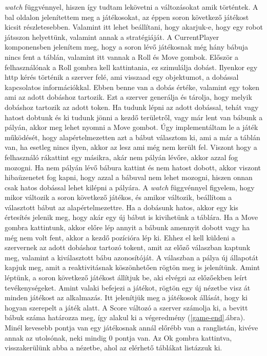 \documentclass[a4paper,twoside]{article}
\begin{document}
\textit{watch} függvénnyel, hiszen így tudtam lekövetni a változásokat amik történtek. A bal oldalon jelenítettem meg a játékosokat, az éppen soron következő játékost kicsit részletesebben. Valamint itt lehet beállítani, hogy akarjuk-e, hogy egy robot játsszon helyettünk, valamint annak a stratégiáját. A CurrentPlayer komponensben jelenítem meg, hogy a soron lévő játékosnak még hány bábuja nincs fent a táblán, valamint itt vannak a Roll és Move gombok. Először a felhasználónak a Roll gombra kell kattintania, ez szimulálja dobást. Ilyenkor egy http kérés történik a szerver felé, ami visszaad egy objektumot, a dobással kapcsolatos információkkal. Ebben benne van a dobás értéke, valamint egy token ami az adott dobáshoz tartozik. Ezt a szerver generálja és tárolja, hogy melyik dobáshoz tartozik az adott token. Ha tudunk lépni az adott dobással, tehát vagy hatost dobtunk és ki tudunk jönni a kezdő területről, vagy már lent van bábunk a pályán, akkor meg lehet nyomni a Move gombot. Úgy implementáltam le a játék működését, hogy alapértelmezetten azt a bábut választom ki, ami a már a táblán van, ha esetleg nincs ilyen, akkor az lesz ami még nem került fel. Viszont hogy a felhasználó rákattint egy másikra, akár nem pályán lévőre, akkor azzal fog mozogni. Ha nem pályán lévő bábura kattint és nem hatost dobott, akkor viszont hibaüzenetet fog kapni, hogy azzal a bábuval nem lehet mozogni, hiszen onnan csak hatos dobással lehet kilépni a pályára. A \textit{watch} függvénnyel figyelem, hogy mikor változik a soron következő játékos, és amikor változik, beállítom a választott bábut az alapértelmezettre. Ha a dobásunk hatos, akkor egy kis értesítés jelenik meg, hogy akár egy új bábut is kivihetünk a táblára.  Ha a Move gombra kattintunk, akkor előre lép annyit a bábunk amennyit dobott vagy ha még nem volt fent, akkor a kezdő pozícióra lép ki. Ehhez el kell küldeni a szervernek az adott dobáshoz tartozó tokent, amit az előző válaszban kaptunk meg, valamint a kiválasztott bábu azonosítóját. A válaszban a pálya új állapotát kapjuk meg, amit a reaktivitásnak köszönhetően rögtön meg is jelenítünk. Amint léptünk, a soron következő játékost állítjuk be, aki elvégzi az előzőekben leírt tevékenységeket. Amint valaki befejezi a játékot, rögtön egy új nézetbe visz át minden játékost az alkalmazás. Itt jelenítjük meg a játékosok állását, hogy ki hogyan szerepelt a játék alatt. A Score változó a szerver számolja ki, a bevitt bábuk száma határozza meg, így alakul ki a végeredmény (\ref{game-end}.ábra). Minél kevesebb pontja van egy játékosnak annál előrébb van a ranglistán, kivéve annak az utolsónak, neki mindig 0 pontja van. Az Ok gombra kattintva, visszakerülünk abba a nézetbe, ahol az elérhető táblákat listázzuk ki. 
\end{document}
